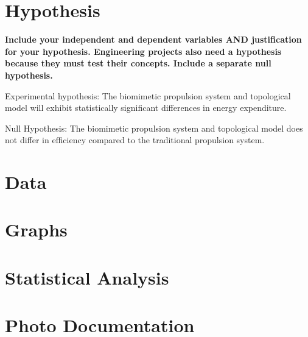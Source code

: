 \documentclass{article}
\begin{document}
\newpage 

\part{Hypothesis}

\textbf{Include your independent and dependent variables AND justification for your hypothesis. Engineering projects also need a hypothesis because they must test their concepts. Include a separate null hypothesis.}

Experimental hypothesis: The biomimetic propulsion system and topological model will exhibit statistically significant differences in energy expenditure.

Null Hypothesis: The biomimetic propulsion system and topological model does not differ in efficiency compared to the traditional propulsion system.

\newpage

\part{Data}
\newpage

\part{Graphs}
\newpage

\part{Statistical Analysis}
\newpage

\part{Photo Documentation}
\newpage

\nocite{*}
\printbibliography
\end{document}
